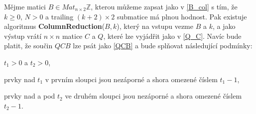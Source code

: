 \begin{vet} \label{col_red}
Mějme matici $ B \in Mat_{n \times 2}\mathbb{Z} $, kterou můžeme zapsat jako v
\ref{B_col} s tím, že $ k \geq 0$, $ N > 0 $ a trailing $ (k+2) \times 2 $
submatice má plnou hodnost. Pak existuje algoritmus \textbf{ColumnReduction}($B, k$),
který na vstupu vezme $ B $ a $ k $, a jako výstup vrátí $ n \times n $
matice $ C $ a $ Q $, které lze vyjádřit jako v \ref{Q_C}. Navíc bude platit, že
součin $ QCB $ lze psát jako \ref{QCB} a bude splňovat následující podmínky:

\begin{Cond}
    \item $ t_1 > 0 $ a $ t_2 > 0 $,
    \item prvky nad $ t_1 $ v prvním sloupci jsou nezáporné a shora omezené číslem
    $ t_1 - 1 $,
    \item prvky nad a pod $ t_2 $ ve druhém sloupci jsou nezáporné a shora omezené
    číslem $ t_2 - 1 $.
\end{Cond}

\end{vet}
